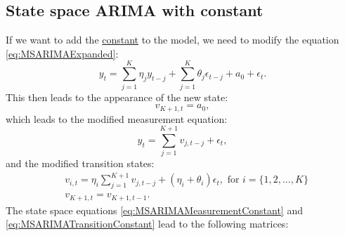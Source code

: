 \documentclass[
]{book}
\theoremstyle{definition}
\theoremstyle{definition}
\theoremstyle{definition}
\theoremstyle{definition}
\theoremstyle{remark}
\begin{document}
\hypertarget{state-space-arima-with-constant}{%
\subsection{State space ARIMA with constant}\label{state-space-arima-with-constant}}

If we want to add the \protect\hyperlink{ARMAConstant}{constant} to the model, we need to modify the equation \eqref{eq:MSARIMAExpanded}:
\begin{equation}
  y_t = \sum_{j=1}^K \eta_j y_{t-j} + \sum_{j=1}^K \theta_j \epsilon_{t-j} + a_0 + \epsilon_t .
  \label{eq:MSARIMAExpandedConstant}
\end{equation}
This then leads to the appearance of the new state:
\begin{equation}
  v_{K+1,t} = a_0 ,
  \label{eq:MSARIMAStateConstant}
\end{equation}
which leads to the modified measurement equation:
\begin{equation}
  y_t = \sum_{j=1}^{K+1} v_{j,t-j} + \epsilon_t ,
  \label{eq:MSARIMAMeasurementConstant}
\end{equation}
and the modified transition states:
\begin{equation}
  \begin{aligned}
    & v_{i,t} = \eta_i \sum_{j=1}^{K+1} v_{j,t-j} + (\eta_i + \theta_i) \epsilon_{t} , \text{ for } i=\{1, 2, \dots, K\} \\
    & v_{K+1, t} = v_{K+1, t-1} .
  \end{aligned}
  \label{eq:MSARIMATransitionConstant}
\end{equation}
The state space equations \eqref{eq:MSARIMAMeasurementConstant} and \eqref{eq:MSARIMATransitionConstant} lead to the following matrices:
\end{document}
